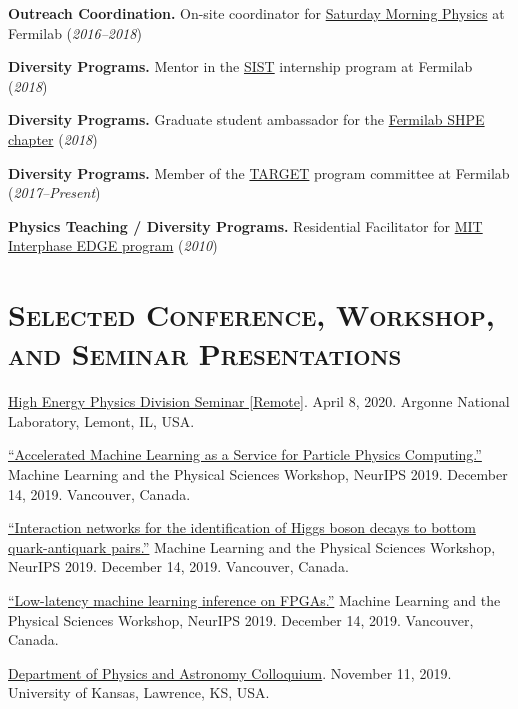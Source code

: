 \documentclass[12pt]{res}
\newcommand{\MarginText}[1]{\section{\textsc{#1}}\vspace{10pt}}
\begin{document}
\begin{resume}
\textbf{Outreach Coordination.} On-site coordinator for \href{http://saturdaymorningphysics.fnal.gov/}{Saturday Morning Physics} at Fermilab (\textit{2016--2018})

\textbf{Diversity Programs.} Mentor in the \href{http://diversity.fnal.gov/sist/}{SIST} internship program at Fermilab (\textit{2018})

\textbf{Diversity Programs.} Graduate student ambassador for the \href{http://diversity.fnal.gov/fshpe/}{Fermilab SHPE chapter} (\textit{2018})

\textbf{Diversity Programs.} Member of the \href{http://diversity.fnal.gov/target/}{TARGET} program committee at Fermilab (\textit{2017--Present})

\textbf{Physics Teaching / Diversity Programs.} Residential Facilitator for \href{http://ome.mit.edu/programs-services/program-overview}{MIT
  Interphase EDGE program} (\textit{2010})


\MarginText{Selected Conference, Workshop, and Seminar Presentations}

\href{https://indico.fnal.gov/event/22961/}{High Energy Physics Division Seminar [Remote]}. April 8, 2020. Argonne National Laboratory, Lemont, IL, USA.

\href{https://ml4physicalsciences.github.io/files/NeurIPS_ML4PS_2019_64.pdf}{``Accelerated Machine Learning as a Service for
Particle Physics Computing.''} Machine Learning and the Physical Sciences Workshop, NeurIPS 2019. December 14, 2019. Vancouver, Canada.

\href{https://ml4physicalsciences.github.io/files/NeurIPS_ML4PS_2019_71.pdf}{``Interaction networks for the identification of Higgs boson decays to bottom quark-antiquark pairs.''} Machine Learning and the Physical Sciences Workshop, NeurIPS 2019.  December 14, 2019. Vancouver, Canada.

\href{https://ml4physicalsciences.github.io/files/NeurIPS_ML4PS_2019_74.pdf}{``Low-latency machine learning inference on FPGAs.''} Machine Learning and the Physical Sciences Workshop, NeurIPS 2019.  December 14, 2019. Vancouver, Canada.

\href{https://physics.drupal.ku.edu/calendar/colloquia#/?i=2}{Department of Physics and Astronomy Colloquium}. November 11, 2019. University of Kansas, Lawrence, KS, USA.


\end{resume}
\end{document}
